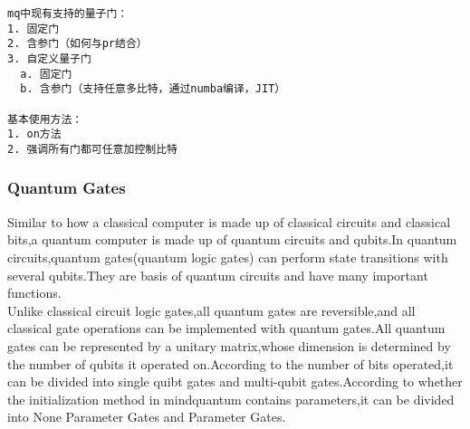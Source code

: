 \begin{lstlisting}
mq中现有支持的量子门：
1. 固定门
2. 含参门（如何与pr结合）
3. 自定义量子门
  a. 固定门
  b. 含参门（支持任意多比特，通过numba编译，JIT）

基本使用方法：
1. on方法
2. 强调所有门都可任意加控制比特
\end{lstlisting}


\maketitle
\subsubsection{Quantum Gates}
Similar to how a classical computer is made up of classical circuits and classical bits,a quantum computer is made up of quantum circuits and qubits.In quantum circuits,quantum gates(quantum logic gates) can perform state transitions with several qubits.They are basis of quantum circuits and have many important functions.\\
Unlike classical circuit logic gates,all quantum gates are reversible,and all classical gate operations can be implemented with quantum gates.All quantum gates can be represented by a unitary matrix,whose dimension is determined by the number of qubits it operated on.According to the number of bits operated,it can be divided into single quibt gates and multi-qubit gates.According to whether the initialization method in mindquantum contains parameters,it can be divided into None Parameter Gates and Parameter Gates.

